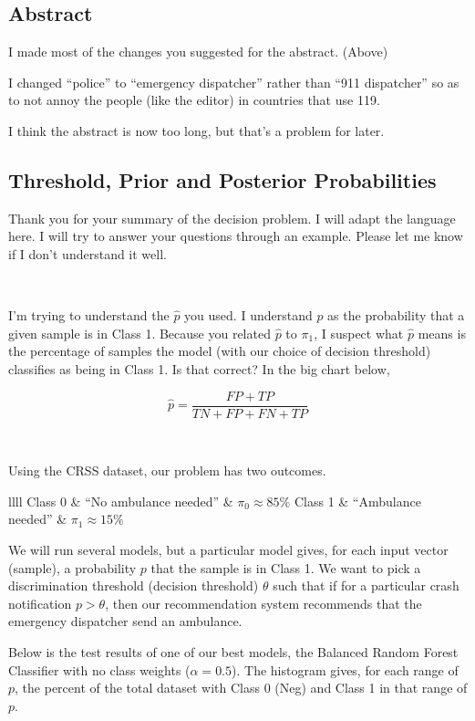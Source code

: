 \subsection{Abstract}

I made most of the changes you suggested for the abstract.  (Above)

I changed ``police'' to ``emergency dispatcher'' rather than ``911 dispatcher'' so as to not annoy the people (like the editor) in countries that use 119.  

I think the abstract is now too long, but that's a problem for later.  

\subsection{Threshold, Prior and Posterior Probabilities}

Thank you for your summary of the decision problem.  I will adapt the language here. I will try to answer your questions through an example.   Please let me know if I don't understand it well.  

\

I'm trying to understand the $\hat{p}$ you used.  I understand $p$ as the probability that a given sample is in Class 1.  Because you related $\hat{p}$ to $\pi_1$, I suspect what $\hat{p}$ means is the percentage of samples the model (with our choice of decision threshold) classifies as being in Class 1.  Is that correct?  In the big chart below, 

$$\hat{p} = \frac{FP + TP}{TN + FP + FN + TP}$$

\

Using the CRSS dataset, our problem has two outcomes.  

\begin{center}
\begin{tabular}{llll}
	Class 0 & ``No ambulance needed'' & $\pi_0 \approx 85\%$ \cr
	Class 1 & ``Ambulance needed'' & $\pi_1 \approx 15\%$ \cr
\end{tabular}
\end{center}

We will run several models, but a particular model gives, for each input vector (sample), a probability $p$ that the sample is in Class 1.  We want to pick a discrimination threshold (decision threshold) $\theta$ such that if for a particular crash notification $p > \theta$, then our recommendation system recommends that the emergency dispatcher send an ambulance.  

Below is the test results of one of our best models, the Balanced Random Forest Classifier with no class weights ($\alpha = 0.5$).  The histogram gives, for each range of $p$, the percent of the total dataset with Class 0 (Neg) and Class 1 in that range of $p$.  

